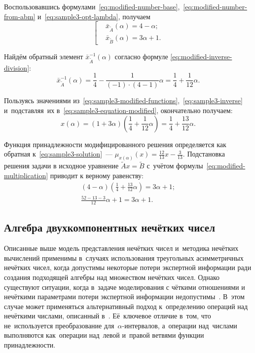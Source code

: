 Воспользовавшись формулами~\eqref{eq:modified-number-base},~\eqref{eq:modified-number-from-abm} и~\eqref{eq:sample3-opt-lambda}, получаем
\begin{equation}
\label{eq:sample3-modified-functions}
  \left[ \begin{aligned}
    & \bar{x}_{\tilde A}\left( \alpha  \right)=4-\alpha;  \\ 
    & \bar{x}_{\tilde B}\left( \alpha  \right)=3\alpha+1.
  \end{aligned} \right.
\end{equation}

Найдём обратный элемент $\bar{x}_{\tilde A}^{-1}\left( \alpha  \right)$ согласно формуле \eqref{eq:modified-inverse-division}: 
\begin{equation}
\label{eq:sample3-inverse}
  \bar{x}_{\tilde A}^{-1}\left(\alpha \right)=\frac{1}{4}-\frac{1}{\left( -1 \right)\cdot \left( 4-1 \right)}\alpha =\frac{1}{4}+\frac{1}{12}\alpha.\end{equation}

Пользуясь значениями из~\eqref{eq:sample3-modified-functions},~\eqref{eq:sample3-inverse} и~подставляя~их в~\eqref{eq:sample3-equation-modified}, окончательно получаем:
\begin{equation}
\label{eq:sample3-solution}
  x\left( \alpha  \right)=\left( 1+3\alpha  \right)\left( \frac{1}{4}+\frac{1}{12}\alpha  \right)=\frac{1}{4}+\frac{13}{12}\alpha.
\end{equation}

Функция принадлежности модифицированного решения определяется как обратная к~\eqref{eq:sample3-solution}~--- $\displaystyle \mu_{x\left(\alpha \right)}\left(x \right)=\frac{12}{13}x-\frac{3}{13}$. Подстановка решения задачи в исходное уравнение $\tilde{A}x=\tilde{B}$ с~учётом формулы~\eqref{eq:modified-multiplication} приводит к верному равенству:
\begin{gather*}
  \left( 4-\alpha  \right)\left( \frac{1}{4}+\frac{13}{12}\alpha  \right)=3\alpha +1; \\
  \frac{52-13-3}{12}\alpha +1=3\alpha +1.  
\end{gather*}

\subsection{Алгебра двухкомпонентных нечётких чисел}

Описанные выше модель представления нечётких чисел и~методика нечётких вычислений применимы в~случаях использования треугольных асимметричных нечётких чисел, когда допустимы некоторые потери экспертной информации ради создания подходящей алгебры над множеством нечётких чисел. Однако существуют ситуации, когда в~задаче моделирования с чёткими отношениями и нечёткими параметрами потери экспертной информации недопустимы~\cite{Hanss_Engineering}. В~этом случае может применяться альтернативный подход к~определению операций над нечёткими числами, описанный в~\cite{Kanischeva}. Её~ключевое отличие в~том, что не~используется преобразование для~$\alpha$-интервалов, а~операции над~числами выполняются как~операции над~левой и~правой ветвями функции принадлежности.

